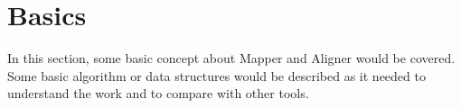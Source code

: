 \documentclass{standalone}
\begin{document}
\section{Basics}
In this section, some basic concept about Mapper and Aligner would be covered. Some basic algorithm or data structures would be described as it needed to understand the work and to compare with other tools.
\end{document}
